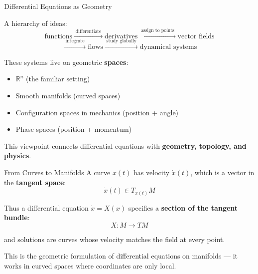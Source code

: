 \begin{frame}{Differential Equations as Geometry}

A hierarchy of ideas:
\[
\text{functions} \xrightarrow{\;\text{differentiate}\;} \text{derivatives} \xrightarrow{\;\text{assign to points}\;} \text{vector fields}
\]
\[
\xrightarrow{\;\text{integrate}\;} \text{flows} \xrightarrow{\;\text{study globally}\;} \text{dynamical systems}
\]

\vspace{0.2cm}

These systems live on geometric \textbf{spaces}:
\begin{itemize}
\item $\mathbb{R}^n$ (the familiar setting)
\item Smooth manifolds (curved spaces)
\item Configuration spaces in mechanics (position + angle)
\item Phase spaces (position + momentum)
\end{itemize}

\vspace{0.3cm}
This viewpoint connects differential equations with \textbf{geometry, topology, and physics}.
\end{frame}


\begin{frame}{From Curves to Manifolds}
A curve $x(t)$ has velocity $\dot{x}(t)$,
which is a vector in the \textbf{tangent space}:
\[
\dot{x}(t) \in T_{x(t)}M
\]

Thus a differential equation $\dot{x} = X(x)$ specifies a \textbf{section of the tangent bundle}:
\[
X : M \rightarrow TM
\]

and solutions are curves whose velocity matches the field at every point.

This is the geometric formulation of differential equations on manifolds --- it works in curved spaces where coordinates are only local.
\end{frame}

